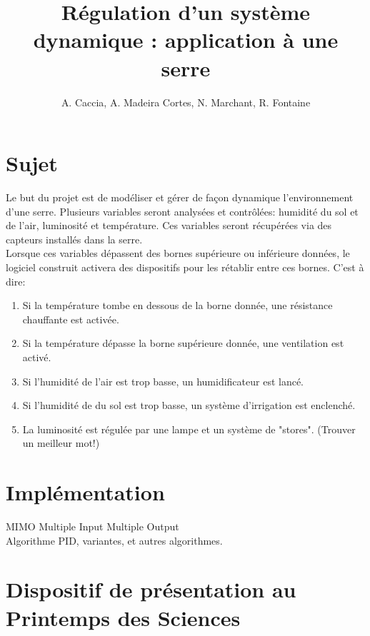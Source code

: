 \documentclass[a4paper,10pt]{article}
\title{Régulation d'un système dynamique : application à une serre}
\author{A. Caccia, A. Madeira Cortes, N. Marchant, R. Fontaine}
\date{ }
\begin{document}
\maketitle

\vspace{2cm}

\section{Sujet}

Le but du projet est de modéliser et gérer de façon dynamique l'environnement d'une serre. Plusieurs variables seront analysées et contrôlées: humidité du sol et de l'air, luminosité et température. Ces variables seront récupérées via des capteurs installés dans la serre. \\

Lorsque ces variables dépassent des bornes supérieure ou inférieure données, le logiciel construit activera des dispositifs pour les rétablir entre ces bornes. C'est à dire: \\

\begin{enumerate}
	\item Si la température tombe en dessous de la borne donnée, une résistance chauffante est activée.
	\item Si la température dépasse la borne supérieure donnée, une ventilation est activé.
	\item Si l'humidité de l'air est trop basse, un humidificateur est lancé.
	\item Si l'humidité de du sol est trop basse, un système d'irrigation est enclenché.
	\item La luminosité est régulée par une lampe et un système de "stores". (Trouver un meilleur mot!)\\
\end{enumerate}

\section{Implémentation}

MIMO Multiple Input Multiple Output \\

Algorithme PID, variantes, et autres algorithmes.\\

\section{Dispositif de présentation au Printemps des Sciences}
\end{document}
